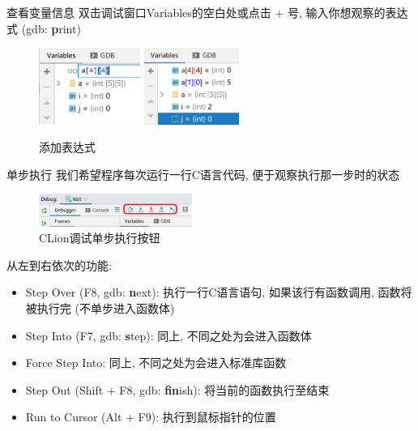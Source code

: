 \begin{frame}[fragile]{查看变量信息}
    双击调试窗口Variables的空白处或点击 + 号, 输入你想观察的表达式 (gdb: \textbf{p}rint)
    \begin{figure}[ht!]
        \centering
        \includegraphics[height=25mm]{figs/clion_new_watch.png}
        \includegraphics[height=25mm]{figs/clion_new_watch2.png}
        \caption{添加表达式}
    \end{figure}
\end{frame}

\begin{frame}[fragile]{单步执行}
    我们希望程序每次运行一行C语言代码, 便于观察执行那一步时的状态
    \begin{figure}[ht!]
        \centering
        \includegraphics[width=50mm]{figs/clion_step_buttons.png}
        \caption{CLion调试单步执行按钮}
    \end{figure}
    从左到右依次的功能:
    \begin{itemize}[<+- | alert@+>]
        \item Step Over (F8, gdb: \textbf{n}ext): 执行一行C语言语句,  如果该行有函数调用, 函数将被执行完 (不单步进入函数体)
        \item Step Into (F7, gdb: \textbf{s}tep): 同上, 不同之处为会进入函数体
        \item Force Step Into: 同上, 不同之处为会进入标准库函数
        \item Step Out (Shift + F8, gdb: \textbf{fin}ish): 将当前的函数执行至结束
        \item Run to Cursor (Alt + F9): 执行到鼠标指针的位置
    \end{itemize}
\end{frame}

